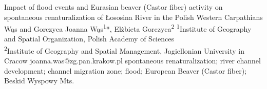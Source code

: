 \abstract
{Impact of flood events and Eurasian beaver (Castor fiber) activity on spontaneous renaturalization of Łososina River in the Polish Western Carpathians} %
{Wąs and Gorczyca} %
{Joanna Wąs\textsuperscript{1}*, Elżbieta Gorczyca\textsuperscript{2}} %
{\POtag} %
{\textsuperscript{1}Institute of Geography and Spatial Organization, Polish Academy of Sciences\\
	\textsuperscript{2}Institute of Geography and Spatial Management, Jagiellonian University in Cracow} %
{joanna.was@zg.pan.krakow.pl}  %
{spontaneous renaturalization; river channel development; channel migration zone; flood; European Beaver (Castor fiber); Beskid Wyspowy Mts.}%
